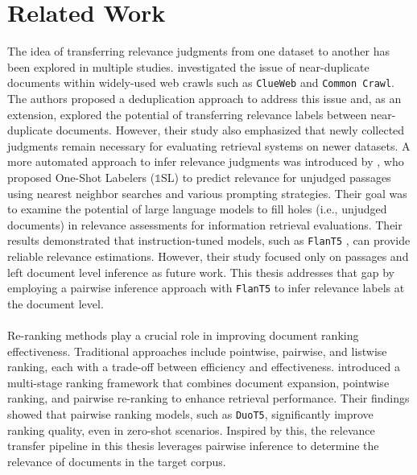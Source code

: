 \chapter{Related Work}\label{related-work}

The idea of transferring relevance judgments from one dataset to another has been explored in multiple studies. \citet{froebe:2021} investigated the issue of near-duplicate documents within widely-used web crawls such as \texttt{ClueWeb} and \texttt{Common Crawl}. The authors proposed a deduplication approach to address this issue and, as an extension, explored the potential of transferring relevance labels between near-duplicate documents. However, their study also emphasized that newly collected judgments remain necessary for evaluating retrieval systems on newer datasets.
A more automated approach to infer relevance judgments was introduced by \citet{macavaney:2023}, who proposed One-Shot Labelers ($\mathbb{1}$SL) to predict relevance for unjudged passages using nearest neighbor searches and various prompting strategies. Their goal was to examine the potential of large language models to fill \glqq holes\grqq{} (i.e., unjudged documents) in relevance assessments for information retrieval evaluations. Their results demonstrated that instruction-tuned models, such as \texttt{FlanT5} \citep{chung:2022}, can provide reliable relevance estimations. However, their study focused only on passages and left document level inference as future work. This thesis addresses that gap by employing a pairwise inference approach with \texttt{FlanT5} to infer relevance labels at the document level.
\\\\
Re-ranking methods play a crucial role in improving document ranking effectiveness. Traditional approaches include pointwise, pairwise, and listwise ranking, each with a trade-off between efficiency and effectiveness. \citet{pradeep:2021} introduced a multi-stage ranking framework that combines document expansion, pointwise ranking, and pairwise re-ranking to enhance retrieval performance. Their findings showed that pairwise ranking models, such as \texttt{DuoT5}, significantly improve ranking quality, even in zero-shot scenarios. Inspired by this, the relevance transfer pipeline in this thesis leverages pairwise inference to determine the relevance of documents in the target corpus.
\\\\
